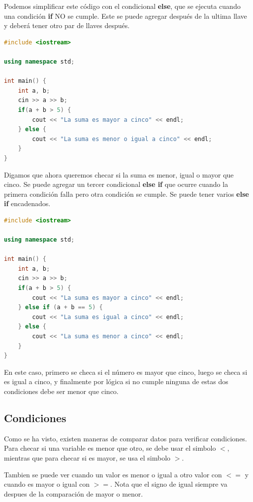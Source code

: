 \documentclass{article}
\begin{document}
Podemos simplificar este código con el condicional \textbf{else}, que se ejecuta cuando una condición \textbf{if} NO se cumple. Este se puede agregar después de la ultima llave y deberá tener otro par de llaves después.

\begin{lstlisting}[language=C++, caption=Else]
#include <iostream>

using namespace std;

int main() {
    int a, b;
    cin >> a >> b;
    if(a + b > 5) {
        cout << "La suma es mayor a cinco" << endl;
    } else {
        cout << "La suma es menor o igual a cinco" << endl;
    }
}
\end{lstlisting}

Digamos que ahora queremos checar si la suma es menor, igual o mayor que cinco. Se puede agregar un tercer condicional \textbf{else if} que ocurre cuando la primera condición falla pero otra condición se cumple. Se puede tener varios \textbf{else if} encadenados.

\begin{lstlisting}[language=C++, caption=Else if]
#include <iostream>

using namespace std;

int main() {
    int a, b;
    cin >> a >> b;
    if(a + b > 5) {
        cout << "La suma es mayor a cinco" << endl;
    } else if (a + b == 5) {
        cout << "La suma es igual a cinco" << endl;
    } else {
        cout << "La suma es menor a cinco" << endl;
    }
}
\end{lstlisting}

En este caso, primero se checa si el número es mayor que cinco, luego se checa si es igual a cinco, y finalmente por lógica si no cumple ninguna de estas dos condiciones debe ser menor que cinco.

\subsection{Condiciones}

Como se ha visto, existen maneras de comparar datos para verificar condiciones. Para checar si una variable es menor que otro, se debe usar el simbolo \textbf{$<$}, mientras que para checar si es mayor, se usa el simbolo \textbf{$>$}.

Tambien se puede ver cuando un valor es menor o igual a otro valor con \textbf{$<=$} y cuando es mayor o igual con \textbf{$>=$}. Nota que el signo de igual siempre va despues de la comparación de mayor o menor.
\end{document}
